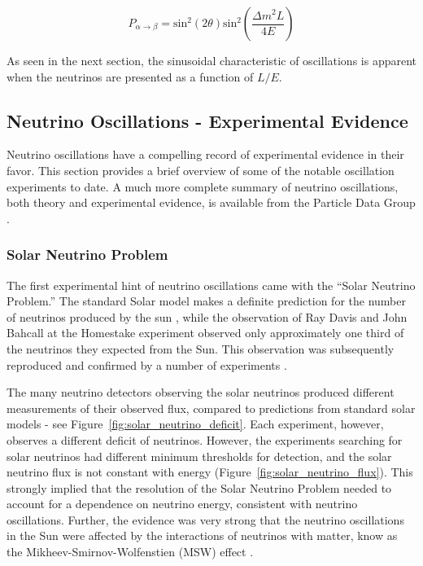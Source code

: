 \begin{equation}
P_{\alpha\rightarrow\beta} = \text{sin}^2(2\theta)\text{sin}^2\left( \frac{\Delta m^2 L}{4 E} \right)
\end{equation}

As seen in the next section, the sinusoidal characteristic of oscillations is apparent when the neutrinos are presented as a function of $L/E$.

\subsection{Neutrino Oscillations - Experimental Evidence}

Neutrino oscillations have a compelling record of experimental evidence in their favor.  This section provides a brief overview of some of the notable oscillation experiments to date.  A much more complete summary of neutrino oscillations, both theory and experimental evidence, is available from the Particle Data Group \cite{pdg_neutrinos}.

\subsubsection{Solar Neutrino Problem}

The first experimental hint of neutrino oscillations came with the ``Solar Neutrino Problem.''  The standard Solar model makes a definite prediction for the number of neutrinos produced by the sun \cite{standard_solar_model}, while the observation of Ray Davis and John Bahcall at the Homestake experiment observed only approximately one third of the neutrinos they expected from the Sun.  This observation was subsequently reproduced and confirmed by a number of experiments \cite{Hampel:1998xg, ukuda:1996sz, Gavrin:2005ks, Anselmann:1992um, Altmann:2005ix, Fukuda:2002pe, Ahmad:2001an, Ahmad:2002jz}.

The many neutrino detectors observing the solar neutrinos produced different measurements of their observed flux, compared to predictions from standard solar models - see Figure~\ref{fig:solar_neutrino_deficit}.  Each experiment, however, observes a different deficit of neutrinos.  However, the experiments searching for solar neutrinos had different minimum thresholds for detection, and the solar neutrino flux is not constant with energy (Figure~\ref{fig:solar_neutrino_flux}).  This strongly implied that the resolution of the Solar Neutrino Problem needed to account for a dependence on neutrino energy, consistent with neutrino oscillations.  Further, the evidence was very strong that the neutrino oscillations in the Sun were affected by the interactions of neutrinos with matter, know as the Mikheev-Smirnov-Wolfenstien (MSW) effect \cite{Wolfenstein:1977ue,Mikheev:1986gs}.

